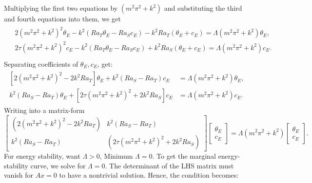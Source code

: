 \documentclass{article}
\begin{document}
Multiplying the first two equations by $(m^{2}\pi^{2} + k^{2})$ and substituting the third and fourth equations into them, we get
\begin{align}
 \begin{split}
  & 2 (m^{2}\pi^{2} + k^{2})^{2} \theta_{E} - k^{2}(Ra_{T} \theta_{E} - Ra_{S}c_{E}) - k^{2}Ra_{T} (\theta_{E} + c_{E}) = \Lambda (m^{2}\pi^{2} + k^{2}) \theta_{E}, \\
  & 2 \tau (m^{2}\pi^{2} + k^{2})^{2} c_{E} - k^{2}(Ra_{T} \theta_{E} - Ra_{S}c_{E}) + k^{2}Ra_{S} (\theta_{E} + c_{E}) = \Lambda (m^{2}\pi^{2} + k^{2}) c_{E}. \\
 \end{split}
\end{align}
Separating coefficients of $\theta_{E}, c_{E}$, get:
\begin{align}
 \begin{split}
  [2 (m^{2}\pi^{2} + k^{2})^{2} - 2k^{2}Ra_{T}] \theta_{E} + k^{2}(Ra_S - Ra_T) c_{E} &= \Lambda (m^{2}\pi^{2} + k^{2}) \theta_{E},\\
  k^{2}(Ra_S - Ra_T)\theta_{E} + [2 \tau (m^{2}\pi^{2} + k^{2})^{2} + 2k^{2}Ra_{S}] c_{E} &= \Lambda (m^{2}\pi^{2} + k^{2}) c_{E}.
 \end{split}
\end{align}
Writing into a matrix-form
\begin{equation}
 \begin{bmatrix}
  (2 (m^{2}\pi^{2} + k^{2})^{2} - 2k^{2}Ra_{T}) & k^{2}(Ra_S - Ra_T)\\
  k^{2}(Ra_S - Ra_T) & (2 \tau (m^{2}\pi^{2} + k^{2})^{2} + 2k^{2}Ra_{S})
 \end{bmatrix}
 \begin{bmatrix}
  \theta_{E}\\
  c_{E}
 \end{bmatrix}
 = \Lambda (m^{2}\pi^{2} + k^{2})\begin{bmatrix}
  \theta_{E}\\
  c_{E}
 \end{bmatrix}.
\end{equation}
For energy stability, want $\Lambda > 0$, Minimum $\Lambda = 0$. To get the marginal energy-stability curve, we solve for $\Lambda = 0$. The determinant of the LHS matrix must vanish for $Ax = 0$ to have a nontrivial solution. Hence, the condition becomes:
\end{document}
